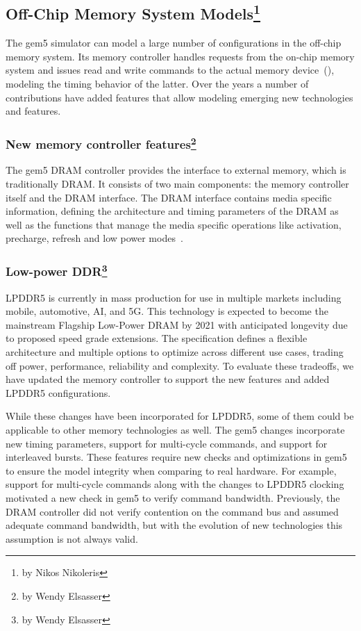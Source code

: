 \subsection[Off-Chip Memory System Models]{Off-Chip Memory System Models\footnote{by Nikos Nikoleris}}
\label{sec:dramcontroller}

The gem5 simulator can model a large number of configurations in the off-chip memory system.
Its memory controller handles requests from the on-chip memory system and issues read and write commands to the actual memory device~\cite{}(), modeling the timing behavior of the latter.
Over the years a number of contributions have added features that allow modeling emerging new technologies and features.

\subsubsection[New memory controller features]{New memory controller features\footnote{by Wendy Elsasser}}

The gem5 DRAM controller provides the interface to external memory, which is traditionally DRAM.
It consists of two main components: the memory controller itself and the DRAM interface.
The DRAM interface contains media specific information, defining the architecture and timing parameters of the DRAM as well as the functions that manage the media specific operations like activation, precharge, refresh and low power modes~\cite{HanssonAgarwal2014-gem5DRAM}.

\subsubsection[Low-power DDR]{Low-power DDR\footnote{by Wendy Elsasser}}

LPDDR5 is currently in mass production for use in multiple markets including mobile, automotive, AI, and 5G.
This technology is expected to become the mainstream Flagship Low-Power DRAM by 2021 with anticipated longevity due to proposed speed grade extensions.
The specification defines a flexible architecture and multiple options to optimize across different use cases, trading off power, performance, reliability and complexity.
To evaluate these tradeoffs, we have updated the memory controller to support the new features and added LPDDR5 configurations.

While these changes have been incorporated for LPDDR5, some of them could be applicable to other memory technologies as well.
The gem5 changes incorporate new timing parameters, support for multi-cycle commands, and support for interleaved bursts.
These features require new checks and optimizations in gem5 to ensure the model integrity when comparing to real hardware.
For example, support for multi-cycle commands along with the changes to LPDDR5 clocking motivated a new check in gem5 to verify command bandwidth.
Previously, the DRAM controller did not verify contention on the command bus and assumed adequate command bandwidth, but with the evolution of new technologies this assumption is not always valid.

